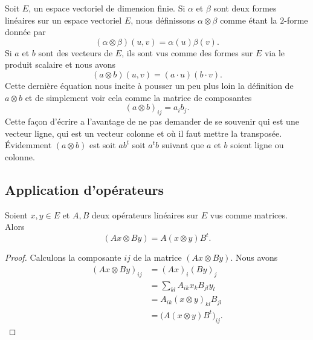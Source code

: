 Soit \( E\), un espace vectoriel de dimension finie. Si \( \alpha\) et \( \beta\) sont deux formes linéaires sur un espace vectoriel \( E\), nous définissons \( \alpha\otimes \beta\) comme étant la \( 2\)-forme donnée par
\begin{equation}        \label{EQooUNRYooKBrXyK}
    (\alpha\otimes \beta)(u,v)=\alpha(u)\beta(v).
\end{equation}
Si \( a\) et \( b\) sont des vecteurs de \( E\), ils sont vus comme des formes sur \( E\) via le produit scalaire et nous avons
\begin{equation}
    (a\otimes b)(u,v)=(a\cdot u)(b\cdot v).
\end{equation}
Cette dernière équation nous incite à pousser un peu plus loin la définition de \( a\otimes b\) et de simplement voir cela comme la matrice de composantes
\begin{equation}
    (a\otimes b)_{ij}=a_ib_j.
\end{equation}
Cette façon d'écrire a l'avantage de ne pas demander de se souvenir qui est une vecteur ligne, qui est un vecteur colonne et où il faut mettre la transposée. Évidemment \( (a\otimes b)\) est soit \( ab^t\) soit \( a^tb\) suivant que \( a\) et \( b\) soient ligne ou colonne.

\subsection{Application d'opérateurs}

\begin{lemma}   \label{LemMyKPzY}
    Soient \( x,y\in E\) et \( A,B\) deux opérateurs linéaires sur \( E\) vus comme matrices. Alors
    \begin{equation}        \label{EqXdxvSu}
        (Ax\otimes By)=A(x\otimes y)B^t.
    \end{equation}
\end{lemma}

\begin{proof}
    Calculons la composante \( ij\) de la matrice \( (Ax\otimes By)\). Nous avons
    \begin{subequations}
        \begin{align}
            (Ax\otimes By)_{ij}&=(Ax)_i(By)_j\\
            &=\sum_{kl}A_{ik}x_kB_{jl}y_l\\
            &=A_{ik}(x\otimes y)_{kl}B_{jl}\\
            &=\big( A(x\otimes y)B^t \big)_{ij}.
        \end{align}
    \end{subequations}
\end{proof}


